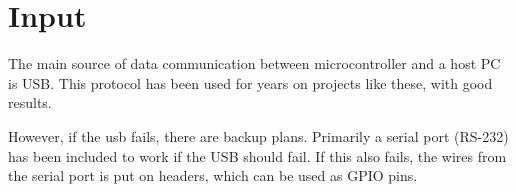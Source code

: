 \section{Input}

The main source of data communication between microcontroller and a host PC is USB.
This protocol has been used for years on projects like these, with good results. 

However, if the usb fails, there are backup plans.
Primarily a serial port (RS-232) has been included to work if the USB should fail.
If this also fails, the wires from the serial port is put on headers, which can be used as GPIO pins.
